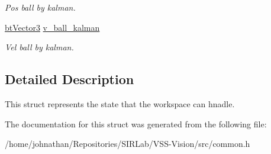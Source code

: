 \begin{DoxyCompactItemize}
\begin{DoxyCompactList}\small\item\em Pos ball by kalman. \end{DoxyCompactList}\item 
\hyperlink{structcommon_1_1btVector3}{bt\+Vector3} \hyperlink{structcommon_1_1State_adc2d51526dffd90f889324c90fa082a0}{v\+\_\+ball\+\_\+kalman}\hypertarget{structcommon_1_1State_adc2d51526dffd90f889324c90fa082a0}{}\label{structcommon_1_1State_adc2d51526dffd90f889324c90fa082a0}

\begin{DoxyCompactList}\small\item\em Vel ball by kalman. \end{DoxyCompactList}\end{DoxyCompactItemize}


\subsection{Detailed Description}
This struct represents the state that the workspace can hnadle. 

The documentation for this struct was generated from the following file\+:\begin{DoxyCompactItemize}
\item 
/home/johnathan/\+Repositories/\+S\+I\+R\+Lab/\+V\+S\+S-\/\+Vision/src/common.\+h\end{DoxyCompactItemize}
